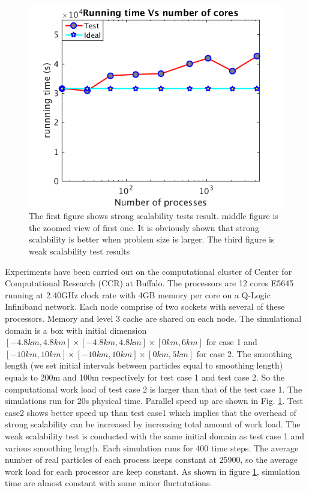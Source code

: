 \documentclass[procedia]{easychair}
\begin{document}
\begin{figure}[!t]
\includegraphics[scale=0.31]{weak_scale}
\caption{The first figure shows strong scalability tests result. middle figure is the zoomed view of first one. It is obviously shown that strong scalability is better when problem size is larger. The third figure is weak scalability test results}
\label{fig:2cases_efficiency}
\end{figure}
%
Experiments have been carried out on the computational cluster of Center for Computational Research (CCR) at Buffalo. 
The processors are 12 cores E5645 running at 2.40GHz clock rate with 4GB memory per core on a Q-Logic Infiniband network. Each node comprise of two sockets with several of these processors. Memory and level 3 cache are shared on each node. The simulational domain is a box with initial dimension $[-4.8km, 4.8km]\times [-4.8km, 4.8km] \times [0km, 6km]$ for case 1 and $[-10km, 10km]\times [-10km, 10km] \times [0km, 5km]$ for case 2. The smoothing length (we set initial intervals between particles equal to smoothing length) equals to 200m and 100m respectively for test case 1 and test case 2. So the computational work load of test case 2 is larger than that of the test case 1. The simulations run for 20s physical time.  Parallel speed up are shown in Fig. \ref{fig:2cases_efficiency}. Test case2 shows better speed up than test case1 which implies that the overhead of strong scalability can be increased by increasing total amount of work load.
The weak scalability test is conducted with the same initial domain as test case 1 and various smoothing length. Each simulation runs for 400 time steps. The average number of real particles of each process keeps constant at $25900$, so the average work load for each processor are keep constant. 
As shown in figure \ref{fig:2cases_efficiency}, simulation time are almost constant with some minor fluctutations.\\
\end{document}
